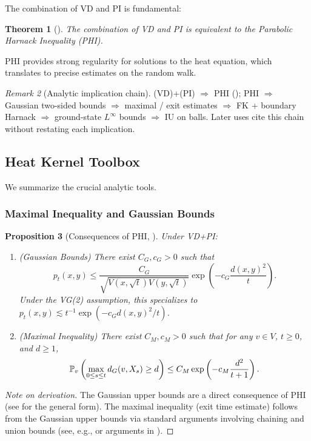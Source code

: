 \documentclass{article}
\numberwithin{equation}{section}
\newtheorem{theorem}{Theorem}[section]
\newtheorem{proposition}[theorem]{Proposition}
\theoremstyle{definition}
\theoremstyle{remark}
\newtheorem{remark}[theorem]{Remark}
\newcommand{\Prob}{\mathbb{P}}
\begin{document}
The combination of VD and PI is fundamental:

\begin{theorem}[\cite{Delmotte99}]\label{thm:Delmotte}
The combination of VD and PI is equivalent to the Parabolic Harnack Inequality (PHI).
\end{theorem}

PHI provides strong regularity for solutions to the heat equation, which translates to precise estimates on the random walk.

\begin{remark}[Analytic implication chain]\label{rem:chain}
(VD)+(PI) $\Rightarrow$ PHI (); PHI $\Rightarrow$ Gaussian two-sided bounds $\Rightarrow$ maximal / exit estimates $\Rightarrow$ FK + boundary Harnack $\Rightarrow$ ground-state $L^\infty$ bounds $\Rightarrow$ IU on balls. Later uses cite this chain without restating each implication.
\end{remark}

\subsection{Heat Kernel Toolbox}
We summarize the crucial analytic tools.

\subsubsection{Maximal Inequality and Gaussian Bounds}

\begin{proposition}[Consequences of PHI, \cite{Delmotte99, Grigoryan09}]\label{prop:maximal}
Under VD+PI:
\begin{enumerate}
    \item (Gaussian Bounds) There exist $C_G, c_G > 0$ such that
    \[
    p_t(x,y) \leq \frac{C_G}{\sqrt{V(x,\sqrt{t}) V(y,\sqrt{t})}} \exp\left(-c_G \frac{d(x,y)^2}{t}\right).
    \]
    Under the VG(2) assumption, this specializes to $p_t(x,y) \lesssim t^{-1} \exp(-c_G d(x,y)^2/t)$.
    \item (Maximal Inequality) There exist $C_M,c_M > 0$ such that for any $v \in V$, $t \geq 0$, and $d \geq 1$,
    \begin{equation}\label{eq:max_ineq}
    \small
    \Prob_v\left( \max_{0 \leq s \leq t} d_G(v,X_s) \geq d \right) \leq C_M \exp\left(-c_M \frac{d^2}{t+1}\right).
    \end{equation}
\end{enumerate}
\end{proposition}
\begin{proof}[Note on derivation]
The Gaussian upper bounds are a direct consequence of PHI (see \cite{Delmotte99} for the general form). The maximal inequality (exit time estimate) follows from the Gaussian upper bounds via standard arguments involving chaining and union bounds (see, e.g., \cite[Theorem 5.5.3]{Grigoryan09} or arguments in \cite{Delmotte99}).
\end{proof}
\end{document}
